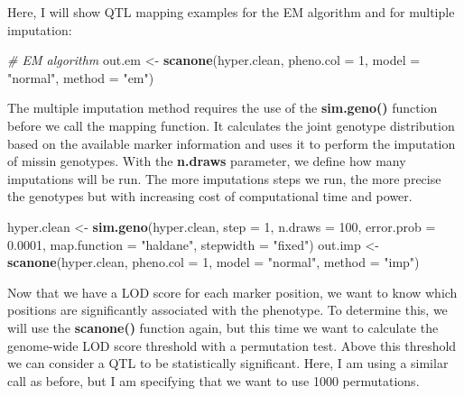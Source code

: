 \documentclass[12pt,]{krantz}
\newenvironment{Shaded}{\begin{snugshade}}{\end{snugshade}}
\newcommand{\KeywordTok}[1]{\textcolor[rgb]{0.27,0.27,0.27}{\textbf{{#1}}}}
\newcommand{\DataTypeTok}[1]{\textcolor[rgb]{0.27,0.27,0.27}{{#1}}}
\newcommand{\DecValTok}[1]{\textcolor[rgb]{0.06,0.06,0.06}{{#1}}}
\newcommand{\FloatTok}[1]{\textcolor[rgb]{0.06,0.06,0.06}{{#1}}}
\newcommand{\StringTok}[1]{\textcolor[rgb]{0.5,0.5,0.5}{{#1}}}
\newcommand{\CommentTok}[1]{\textcolor[rgb]{0.37,0.37,0.37}{\textit{{#1}}}}
\newcommand{\NormalTok}[1]{{#1}}
\begin{document}
Here, I will show QTL mapping examples for the EM algorithm and for
multiple imputation:

\begin{Shaded}
\begin{Highlighting}[]
\CommentTok{# EM algorithm}
\NormalTok{out.em <-}\StringTok{ }\KeywordTok{scanone}\NormalTok{(hyper.clean, }\DataTypeTok{pheno.col =} \DecValTok{1}\NormalTok{, }\DataTypeTok{model =} \StringTok{"normal"}\NormalTok{, }
                  \DataTypeTok{method =} \StringTok{"em"}\NormalTok{)}
\end{Highlighting}
\end{Shaded}

The multiple imputation method requires the use of the
\textbf{sim.geno()} function before we call the mapping function. It
calculates the joint genotype distribution based on the available marker
information and uses it to perform the imputation of missin genotypes.
With the \textbf{n.draws} parameter, we define how many imputations will
be run. The more imputations steps we run, the more precise the
genotypes but with increasing cost of computational time and power.

\begin{Shaded}
\begin{Highlighting}[]
\NormalTok{hyper.clean <-}\StringTok{ }\KeywordTok{sim.geno}\NormalTok{(hyper.clean, }\DataTypeTok{step =} \DecValTok{1}\NormalTok{, }\DataTypeTok{n.draws =} \DecValTok{100}\NormalTok{, }
                        \DataTypeTok{error.prob =} \FloatTok{0.0001}\NormalTok{, }
                        \DataTypeTok{map.function =} \StringTok{"haldane"}\NormalTok{, }
                        \DataTypeTok{stepwidth =} \StringTok{"fixed"}\NormalTok{)}
\NormalTok{out.imp <-}\StringTok{ }\KeywordTok{scanone}\NormalTok{(hyper.clean, }\DataTypeTok{pheno.col =} \DecValTok{1}\NormalTok{, }\DataTypeTok{model =} \StringTok{"normal"}\NormalTok{, }
                   \DataTypeTok{method =} \StringTok{"imp"}\NormalTok{)}
\end{Highlighting}
\end{Shaded}

Now that we have a LOD score for each marker position, we want to know
which positions are significantly associated with the phenotype. To
determine this, we will use the \textbf{scanone()} function again, but
this time we want to calculate the genome-wide LOD score threshold with
a permutation test. Above this threshold we can consider a QTL to be
statistically significant. Here, I am using a similar call as before,
but I am specifying that we want to use 1000 permutations.
\end{document}
